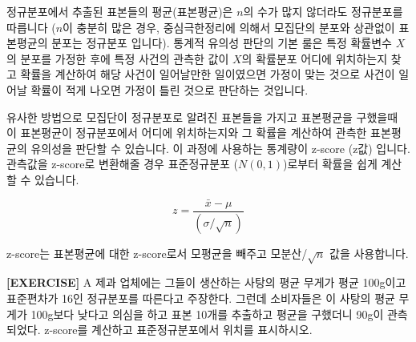 \documentclass[
]{book}
\begin{document}
정규분포에서 추출된 표본들의 평균(표본평균)은 \(n\)의 수가 많지 않더라도 정규분포를 따릅니다 (\(n\)이 충분히 많은 경우, 중심극한정리에 의해서 모집단의 분포와 상관없이 표본평균의 분포는 정규분포 입니다). 통계적 유의성 판단의 기본 룰은 특정 확률변수 \(X\)의 분포를 가정한 후에 특정 사건의 관측한 값이 \(X\)의 확률분포 어디에 위치하는지 찾고 확률을 계산하여 해당 사건이 일어날만한 일이였으면 가정이 맞는 것으로 사건이 일어날 확률이 적게 나오면 가정이 틀린 것으로 판단하는 것입니다.

유사한 방법으로 모집단이 정규분포로 알려진 표본들을 가지고 표본평균을 구했을때 이 표본평균이 정규분포에서 어디에 위치하는지와 그 확률을 계산하여 관측한 표본평균의 유의성을 판단할 수 있습니다. 이 과정에 사용하는 통계량이 z-score (z값) 입니다. 관측값을 z-score로 변환해줄 경우 표준정규분포 (\(N(0, 1)\))로부터 확률을 쉽게 계산할 수 있습니다.

\[ 
z= \frac{\bar{x} - \mu}{(\sigma/\sqrt{n})}
\]

z-score는 표본평균에 대한 z-score로서 모평균을 빼주고 모분산/\(\sqrt{n}\) 값을 사용합니다.

\textbf{{[}EXERCISE{]}} A 제과 업체에는 그들이 생산하는 사탕의 평균 무게가 평균 100g이고 표준편차가 16인 정규분포를 따른다고 주장한다. 그런데 소비자들은 이 사탕의 평균 무게가 100g보다 낮다고 의심을 하고 표본 10개를 추출하고 평균을 구했더니 90g이 관측되었다. z-score를 계산하고 표준정규분포에서 위치를 표시하시오.
\end{document}
